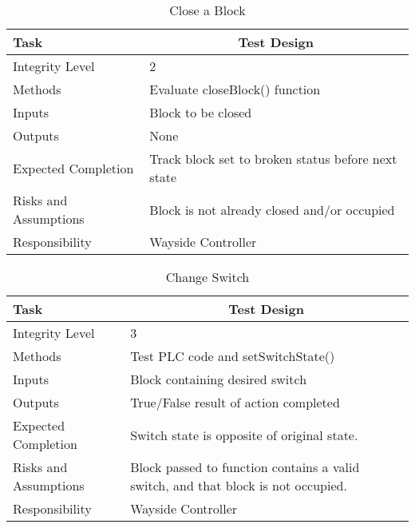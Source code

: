 \documentclass[]{article}
\begin{document}
	\begin{table}[H]
		\centering
		\caption{Close a Block}
		\begin{tabular}{|l|l|}
			\hline
			Task & \multicolumn{1}{c|}{Test Design} \\ \hline
			Integrity Level & 2 \\ \hline
			Methods & Evaluate closeBlock() function\\ \hline
			Inputs &  Block to be closed\\ \hline
			Outputs & None\\ \hline
			Expected Completion & Track block set to broken status before next state \\ \hline
			Risks and Assumptions & \parbox[t]{10cm}{Block is not already closed and/or occupied} \\ \hline
			Responsibility & Wayside Controller\\ \hline
		\end{tabular}
	\end{table}
	
	
	\begin{table}[H]
		\centering
		\caption{Change Switch}
		\begin{tabular}{|l|l|}
			\hline
			Task & \multicolumn{1}{c|}{Test Design} \\ \hline
			Integrity Level & 3 \\ \hline
			Methods & Test PLC code and setSwitchState()\\ \hline
			Inputs &  Block containing desired switch\\ \hline
			Outputs &  True/False result of action completed\\ \hline
			Expected Completion & Switch state is opposite of original state. \\ \hline
			Risks and Assumptions & \parbox[t]{10cm}{Block passed to function contains a valid switch, and that block is not occupied.} \\ \hline
			Responsibility & Wayside Controller\\ \hline
		\end{tabular}
	\end{table}
	
\end{document}
